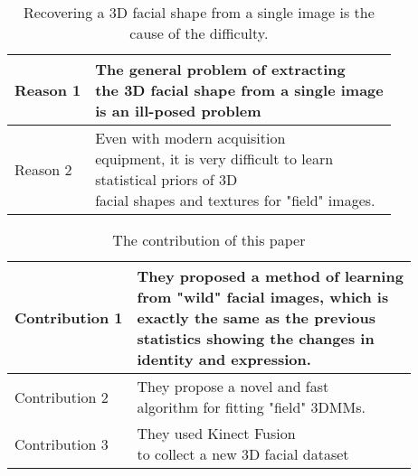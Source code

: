 \documentclass[twocolumn]{article}
\begin{document}
        \begin{table}[H]
            \centering
            \begin{tabular}{|l|l|}
            \hline
            Reason 1 & \tabincell{l}{The general problem of extracting \\ the 3D facial shape  from a single image \\ is an ill-posed problem} \\ \hline
            Reason 2 & \tabincell{l}{Even with modern acquisition \\ equipment, it is very  difficult to learn \\ statistical priors of 3D \\ facial shapes and textures for "field" images.}\\

            \hline
            \end{tabular}
            \caption{Recovering a 3D facial shape from a single image is the cause of the difficulty.}
            \label{Table1}
        \end{table}

        \begin{table}[H]
            \centering
            \begin{tabular}{|l|l|}
            \hline
            Contribution 1 & \tabincell{l}{They proposed a method of learning \\ from "wild" facial images, which is \\ exactly the same as the previous \\ statistics  showing the changes in \\ identity and expression.} \\ \hline
            Contribution 2 & \tabincell{l}{They propose a novel and fast \\ algorithm  for fitting "field" 3DMMs.}\\ \hline
            Contribution 3 & \tabincell{l}{They used Kinect Fusion~\cite{[18],[28]} \\ to collect a new 3D facial dataset} \\
            \hline
            \end{tabular}
            \caption{The contribution of this paper}
            \label{Table2}
        \end{table}
\clearpage


\end{document}
